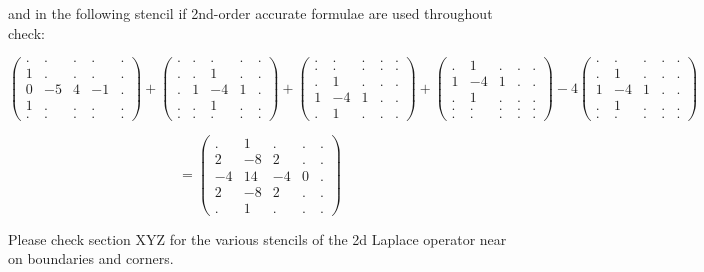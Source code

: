 and in the following stencil if 2nd-order accurate formulae are used 
throughout {\color{red} check}:
{\small
\[
\begin{pmatrix}
. & . &  . & . & . \\
1 & . &  . & . & . \\
0 & -5 & 4 & -1 & . \\
1 & . &  . & . & . \\
. & . &  . & . & . 
\end{pmatrix}
+
\begin{pmatrix}
. & . &  . & . & .\\
. & . &  1 & . & .\\
. & 1 & -4 & 1 & .\\
. & . &  1 & . & .\\
. & . &  . & . & .
\end{pmatrix}
+
\begin{pmatrix}
 . &  . & . & . &.\\
 . &  . & . & . &.\\
 . &  1 & . & . &.\\
 1 & -4 & 1 & . &.\\
 . &  1 & . & . &.
\end{pmatrix}
+
\begin{pmatrix}
 . &  1 & . & . &.\\
 1 & -4 & 1 & . &.\\
 . &  1 & . & . &.\\
 . &  . & . & . &.\\
 . &  . & . & . &.
\end{pmatrix}
-4
\begin{pmatrix}
 . &  . & . & . &.\\
 . &  1 & . & . &.\\
 1 & -4 & 1 & . &.\\
 . &  1 & . & . &.\\
 . &  . & . & . &.
\end{pmatrix}
\]

\[
=
\begin{pmatrix}
. &  1 & . & . &. \\
2 &  -8 & 2 & . &. \\
-4 &  14 & -4 & 0 &. \\
2 &  -8 & 2 & . &. \\
. &  1 & . & . &. 
\end{pmatrix}
\]
}
Please check section XYZ for the various stencils of the 2d Laplace operator near on boundaries and corners.

